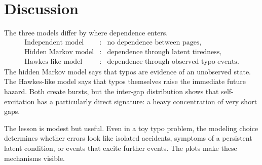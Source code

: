 \documentclass[11pt]{article}
\begin{document}
\section{Discussion}

The three models differ by where dependence enters.
\[
\begin{array}{lll}
\text{Independent model} &:& \text{no dependence between pages},\\
\text{Hidden Markov model} &:& \text{dependence through latent tiredness},\\
\text{Hawkes-like model} &:& \text{dependence through observed typo events}.
\end{array}
\]
The hidden Markov model says that typos are evidence of an unobserved state.
The Hawkes-like model says that typos themselves raise the immediate future
hazard. Both create bursts, but the inter-gap distribution shows that
self-excitation has a particularly direct signature: a heavy concentration of
very short gaps.

The lesson is modest but useful. Even in a toy typo problem, the modeling
choice determines whether errors look like isolated accidents, symptoms of a
persistent latent condition, or events that excite further events. The plots
make these mechanisms visible.
\end{document}
